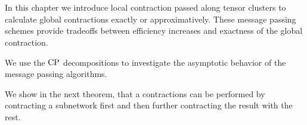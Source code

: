 \chapter{\chatextmessagePassing}\label{cha:messagePassing}

In this chapter we introduce local contraction passed along tensor clusters to calculate global contractions exactly or approximatively.
These message passing schemes provide tradeoffs between efficiency increases and exactness of the global contraction.

We use the $\mathrm{CP}$ decompositions to investigate the asymptotic behavior of the message passing algorithms.



We show in the next theorem, that a contractions can be performed by contracting a subnetwork first and then further contracting the result with the rest.

